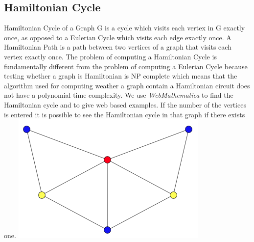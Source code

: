 \documentclass{article}
\begin{document}
 \subsection{Hamiltonian Cycle}
 Hamiltonian Cycle of a Graph G is a cycle which visits each vertex in G exactly once, as opposed to a Eulerian Cycle which visits each edge exactly once. A Hamiltonian Path is a path between two vertices of a graph that visits each vertex exactly once. The problem of computing a Hamiltonian Cycle is fundamentally different from the problem of computing a Eulerian Cycle because testing whether a graph is Hamiltonian is NP complete which means that the algorithm used for computing weather a graph contain a Hamiltonian circuit does not have a polynomial time complexity. \hfill \break
 We use \textit{WebMathematica} to find the Hamiltonian cycle and to give web based examples. If the number of the vertices is entered it is possible to see the Hamiltonian cycle in that graph if there exists one\cite{4}. \hfill \break
 \hfill \break
 \includegraphics{hamiltoniancyclegraphs}
 \hfill \break
\end{document}
